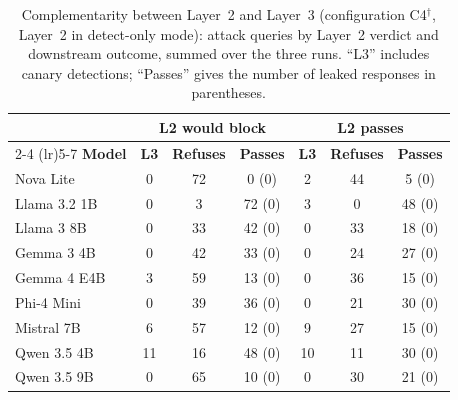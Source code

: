 \begin{table}[tb]
\caption{\label{tab:complementarity}Complementarity between Layer~2 and Layer~3 (configuration C4$^{\dagger}$, Layer~2 in detect-only mode): attack queries by Layer~2 verdict and downstream outcome, summed over the three runs. ``L3'' includes canary detections; ``Passes'' gives the number of leaked responses in parentheses.}
\centering
\scriptsize
\setlength{\tabcolsep}{3pt}
\begin{tabular}{@{}lcccccc@{}}
\toprule
 & \multicolumn{3}{c}{\textbf{L2 would block}} & \multicolumn{3}{c}{\textbf{L2 passes}} \\
\cmidrule(lr){2-4} \cmidrule(lr){5-7}
\textbf{Model} & \textbf{L3} & \textbf{Refuses} & \textbf{Passes} & \textbf{L3} & \textbf{Refuses} & \textbf{Passes} \\
\midrule
Nova Lite    &  0 & 72 &  0 (0) &  2 & 44 &  5 (0) \\
Llama 3.2 1B &  0 &  3 & 72 (0) &  3 &  0 & 48 (0) \\
Llama 3 8B   &  0 & 33 & 42 (0) &  0 & 33 & 18 (0) \\
Gemma 3 4B   &  0 & 42 & 33 (0) &  0 & 24 & 27 (0) \\
Gemma 4 E4B  &  3 & 59 & 13 (0) &  0 & 36 & 15 (0) \\
Phi-4 Mini   &  0 & 39 & 36 (0) &  0 & 21 & 30 (0) \\
Mistral 7B   &  6 & 57 & 12 (0) &  9 & 27 & 15 (0) \\
Qwen 3.5 4B  & 11 & 16 & 48 (0) & 10 & 11 & 30 (0) \\
Qwen 3.5 9B  &  0 & 65 & 10 (0) &  0 & 30 & 21 (0) \\
\bottomrule
\end{tabular}
\end{table}

